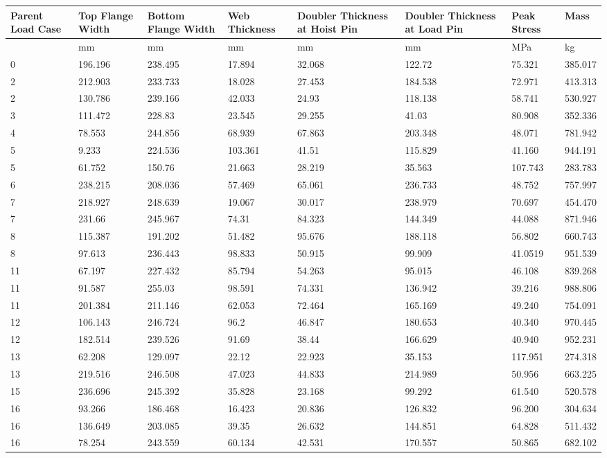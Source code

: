 \begin{table}[!htbp]
\small
\begin{tabular}{|p{1.5cm}p{1.5cm}p{1.5cm}p{1.4cm}p{2cm}p{2cm}p{1.5cm}p{1.5cm}|}
\hline
Parent Load Case&Top Flange Width&Bottom Flange Width&Web Thickness&Doubler Thickness at Hoist Pin&Doubler Thickness at Load Pin&Peak Stress& Mass\\
\hline
&mm&mm&mm&mm&mm&MPa&kg\\
\hline
0&196.196&238.495&17.894&32.068&122.72&75.321&385.017\\
2&212.903&233.733&18.028&27.453&184.538&72.971&413.313\\
2&130.786&239.166&42.033&24.93&118.138&58.741&530.927\\
3&111.472&228.83&23.545&29.255&41.03&80.908&352.336\\
4&78.553&244.856&68.939&67.863&203.348&48.071&781.942\\
5&9.233&224.536&103.361&41.51&115.829&41.160&944.191\\
5&61.752&150.76&21.663&28.219&35.563&107.743&283.783\\
6&238.215&208.036&57.469&65.061&236.733&48.752&757.997\\
7&218.927&248.639&19.067&30.017&238.979&70.697&454.470\\
7&231.66&245.967&74.31&84.323&144.349&44.088&871.946\\
8&115.387&191.202&51.482&95.676&188.118&56.802&660.743\\
8&97.613&236.443&98.833&50.915&99.909&41.0519&951.539\\
11&67.197&227.432&85.794&54.263&95.015&46.108&839.268\\
11&91.587&255.03&98.591&74.331&136.942&39.216&988.806\\
11&201.384&211.146&62.053&72.464&165.169&49.240&754.091\\
12&106.143&246.724&96.2&46.847&180.653&40.340&970.445\\
12&182.514&239.526&91.69&38.44&166.629&40.940&952.231\\
13&62.208&129.097&22.12&22.923&35.153&117.951&274.318\\
13&219.516&246.508&47.023&44.833&214.989&50.956&663.225\\
15&236.696&245.392&35.828&23.168&99.292&61.540&520.578\\
16&93.266&186.468&16.423&20.836&126.832&96.200&304.634\\
16&136.649&203.085&39.35&26.632&144.851&64.828&511.432\\
16&78.254&243.559&60.134&42.531&170.557&50.865&682.102\\

\end{tabular}
\end{table}
